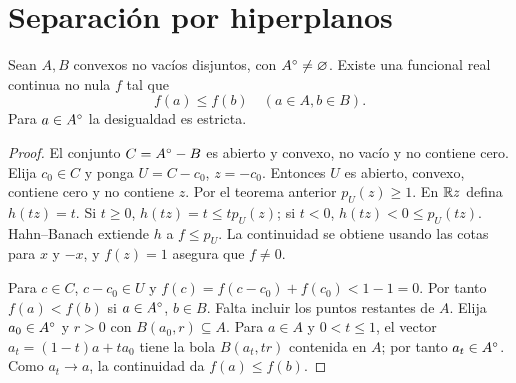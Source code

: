 \section{Separación por hiperplanos}
\begin{teorema}\label{v3:separacion-interior}
Sean $A,B$ convexos no vacíos disjuntos, con $A^{\circ}\ne\varnothing$. Existe una funcional real continua no nula $f$ tal que
\[
 f(a)\leq f(b)\quad(a\in A,b\in B).
\]
Para $a\in A^{\circ}$ la desigualdad es estricta.
\end{teorema}
\begin{proof}
El conjunto $C=A^{\circ}-B$ es abierto y convexo, no vacío y no contiene cero. Elija $c_0\in C$ y ponga $U=C-c_0$, $z=-c_0$. Entonces $U$ es abierto, convexo, contiene cero y no contiene $z$. Por el teorema anterior $p_U(z)\geq1$. En $\mathbb R z$ defina $h(tz)=t$. Si $t\geq0$, $h(tz)=t\leq tp_U(z)$; si $t<0$, $h(tz)<0\leq p_U(tz)$. Hahn--Banach extiende $h$ a $f\leq p_U$. La continuidad se obtiene usando las cotas para $x$ y $-x$, y $f(z)=1$ asegura que $f\ne0$.

Para $c\in C$, $c-c_0\in U$ y $f(c)=f(c-c_0)+f(c_0)<1-1=0$. Por tanto $f(a)<f(b)$ si $a\in A^{\circ}$, $b\in B$. Falta incluir los puntos restantes de $A$. Elija $a_0\in A^{\circ}$ y $r>0$ con $B(a_0,r)\subseteq A$. Para $a\in A$ y $0<t\leq1$, el vector $a_t=(1-t)a+ta_0$ tiene la bola $B(a_t,tr)$ contenida en $A$; por tanto $a_t\in A^{\circ}$. Como $a_t\to a$, la continuidad da $f(a)\leq f(b)$.
\end{proof}

